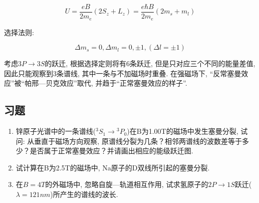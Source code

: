 \begin{equation*}
U = \frac{eB}{2m_e}\left(2S_z + L_z \right) = \frac{e\hbar
B}{2m_e}\left(2m_s + m_l \right)
\end{equation*}

选择法则:

\begin{equation*}
\Delta m_s =0,  \Delta m_l =0, \pm 1, (\Delta l = \pm 1)
\end{equation*}

考虑$3P \to 3S$的跃迁, 根据选择定则将有6条跃迁,
但是只对应三个不同的能量差值, 因此只能观察到3条谱线,
其中一条与不加磁场时重叠. 在强磁场下,
``反常塞曼效应''被``帕邢---贝克效应''取代,
并趋于``正常塞曼效应的样子''.

\subsection*{习题}

\begin{enumerate}
  \item 锌原子光谱中的一条谱线(${}^3S_1 \to
  {}^3P_0$)在B为1.00T的磁场中发生塞曼分裂, 试问:
  从垂直于磁场方向观察,
  原谱线分裂为几条？相邻两谱线的波数差等于多少？是否属于正常塞曼效应？并请画出相应的能级跃迁图.
  \item 试计算在B为2.5T的磁场中, Na原子的D双线所引起的塞曼分裂.
  \item 在$B=4T$的外磁场中, 忽略自旋---轨道相互作用, 试求氢原子的$2P \to
  1S$跃迁($\lambda = 121 nm$)所产生的谱线的波长.
\end{enumerate}
